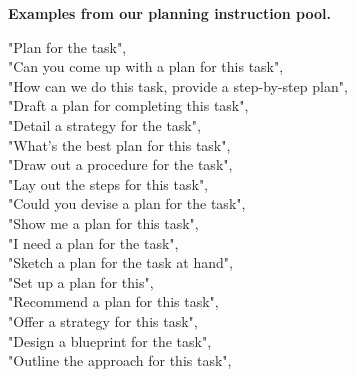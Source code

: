\begin{table}[t!]
\caption{\textbf{Examples from our planning instruction pool.}}
\vspace{-4pt}
\begin{tcolorbox}
\begin{minipage}{\linewidth}
    "Plan for the task",\\
    "Can you come up with a plan for this task",\\
    "How can we do this task, provide a step-by-step plan",\\
    "Draft a plan for completing this task",\\
    "Detail a strategy for the task",\\
    "What's the best plan for this task",\\
    "Draw out a procedure for the task",\\
    "Lay out the steps for this task",\\
    "Could you devise a plan for the task",\\
    "Show me a plan for this task",\\
    "I need a plan for the task",\\
    "Sketch a plan for the task at hand",\\
    "Set up a plan for this",\\
    "Recommend a plan for this task",\\
    "Offer a strategy for this task",\\
    "Design a blueprint for the task",\\
    "Outline the approach for this task",
\end{minipage}
\end{tcolorbox}

\label{plan cap}
\end{table}


